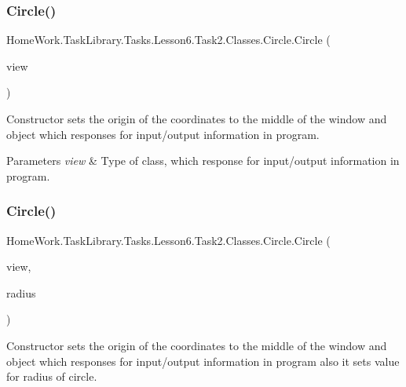 \subsubsection{\texorpdfstring{Circle()}{Circle()}\hspace{0.1cm}{\footnotesize\ttfamily [1/2]}}
{\footnotesize\ttfamily Home\+Work.\+Task\+Library.\+Tasks.\+Lesson6.\+Task2.\+Classes.\+Circle.\+Circle (\begin{DoxyParamCaption}\item[{I\+Information}]{view }\end{DoxyParamCaption})}



Constructor sets the origin of the coordinates to the middle of the window and object which responses for input/output information in program. 


\begin{DoxyParams}{Parameters}
{\em view} & Type of class, which response for input/output information in program.\\
\hline
\end{DoxyParams}
\mbox{\label{class_home_work_1_1_task_library_1_1_tasks_1_1_lesson6_1_1_task2_1_1_classes_1_1_circle_a6417adac262a4c64223d928213bc4742}} 
\subsubsection{\texorpdfstring{Circle()}{Circle()}\hspace{0.1cm}{\footnotesize\ttfamily [2/2]}}
{\footnotesize\ttfamily Home\+Work.\+Task\+Library.\+Tasks.\+Lesson6.\+Task2.\+Classes.\+Circle.\+Circle (\begin{DoxyParamCaption}\item[{I\+Information}]{view,  }\item[{int}]{radius }\end{DoxyParamCaption})}



Constructor sets the origin of the coordinates to the middle of the window and object which responses for input/output information in program also it sets value for radius of circle. 


